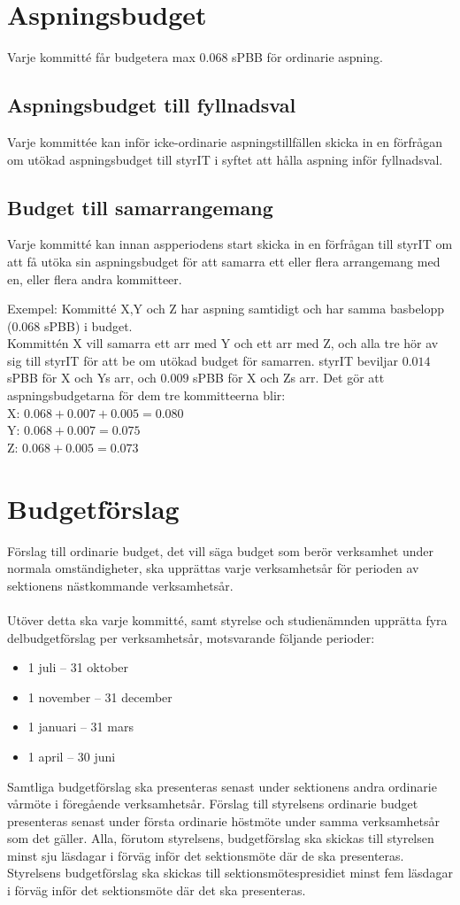 \documentclass[11pt, includeaddress]{classes/cthit}
\begin{document}
\section{Aspningsbudget}

Varje kommitté får budgetera max $0.068$ sPBB för ordinarie aspning.

\subsection{Aspningsbudget till fyllnadsval}
Varje kommittée kan inför icke-ordinarie aspningstillfällen skicka in en förfrågan om utökad aspningsbudget till styrIT i syftet att hålla aspning inför fyllnadsval.

\subsection{Budget till samarrangemang}
Varje kommitté kan innan aspperiodens start skicka in en förfrågan till styrIT om att få utöka sin aspningsbudget för att samarra ett eller flera arrangemang med en, eller flera andra kommitteer.

Exempel: Kommitté X,Y och Z har aspning samtidigt och har samma basbelopp ($0.068$ sPBB) i budget.\\
Kommittén X vill samarra ett arr med Y och ett arr med Z, och alla tre hör av sig till styrIT för att be om utökad budget för samarren.
styrIT beviljar $0.014$ sPBB för X och Ys arr, och $0.009$ sPBB för X och Zs arr. Det gör att aspningsbudgetarna för dem tre kommitteerna blir:\\
X: $0.068+0.007+0.005=0.080$\\
Y: $0.068+0.007=0.075$\\
Z: $0.068+0.005=0.073$

\section{Budgetförslag}
Förslag till ordinarie budget, det vill säga budget som berör verksamhet under normala omständigheter, ska upprättas varje verksamhetsår för perioden av sektionens nästkommande verksamhetsår.\\\\
Utöver detta ska varje kommitté, samt styrelse och studienämnden upprätta fyra delbudgetförslag per verksamhetsår, motsvarande följande perioder:
\begin{itemize}
    \item 1 juli – 31 oktober
    \item 1 november – 31 december
    \item 1 januari – 31 mars
    \item 1 april – 30 juni
\end{itemize}
Samtliga budgetförslag ska presenteras senast under sektionens andra ordinarie vårmöte i föregående verksamhetsår. Förslag till styrelsens ordinarie budget presenteras senast under första ordinarie höstmöte under samma verksamhetsår som det gäller. Alla, förutom styrelsens, budgetförslag ska skickas till styrelsen minst sju läsdagar i förväg inför det sektionsmöte där de ska presenteras. Styrelsens budgetförslag ska skickas till sektionsmötespresidiet minst fem läsdagar i förväg inför det sektionsmöte där det ska presenteras.
\end{document}
